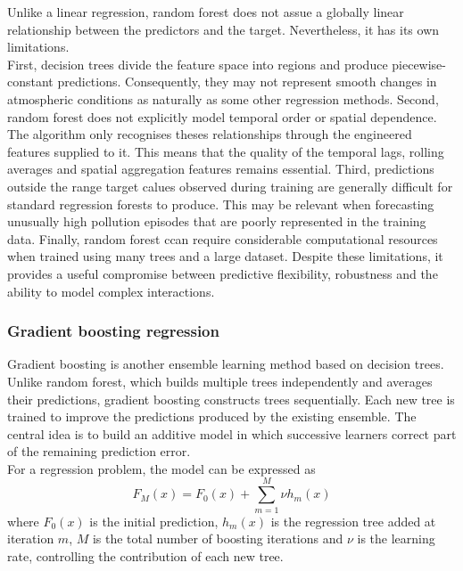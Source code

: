 \documentclass[11pt,a4paper]{article}
\begin{document}
\noindent
Unlike a linear regression, random forest does not assue a globally linear relationship between the predictors and the target.  Nevertheless, it has its own limitations.\\

\noindent
First, decision trees divide the feature space into regions and produce piecewise-constant predictions. Consequently, they may not represent smooth changes in atmospheric conditions as naturally as some other regression methods. Second, random forest does not explicitly model temporal order or spatial dependence. The algorithm only recognises theses relationships through the engineered features supplied to it. This means that the quality of the temporal lags, rolling averages and spatial aggregation features remains essential. Third, predictions outside the range target calues observed during training are generally difficult for standard regression forests to produce. This may be relevant when forecasting unusually high pollution episodes that are poorly represented in the training data. Finally, random forest ccan require considerable computational resources when trained using many trees and a large dataset. Despite these limitations, it provides a useful compromise between predictive flexibility, robustness and the ability to model complex interactions.

\subsubsection{Gradient boosting regression}
Gradient boosting is another ensemble learning method based on decision trees. Unlike random forest, which builds multiple trees independently and averages their predictions, gradient boosting constructs trees sequentially. Each new tree is trained to improve the predictions produced by the existing ensemble. The central idea is to build an additive model in which successive learners correct part of the remaining prediction error.\\

\noindent
For a regression problem, the model can be expressed as
\begin{equation}
    F_M(x)=F_0(x)+\sum_{m=1}^M\nu h_m(x)
\end{equation}
where $F_0(x)$ is the initial prediction, $h_m(x)$ is the regression tree added at iteration $m$, $M$ is the total number of boosting iterations and $\nu$ is the learning rate, controlling the contribution of each new tree.\\
\end{document}
